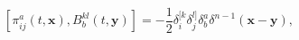 \begin{equation}
\left[ \pi _{ij}^{a}(t,\mathbf{x}),B_{b}^{kl}(t,\mathbf{y})\right] =-\frac{1%
}{2}\delta _{i}^{[k}\delta _{j}^{l]}\delta _{b}^{a}\delta ^{n-1}\left(
\mathbf{x-y}\right) ,  \label{f10}
\end{equation}


